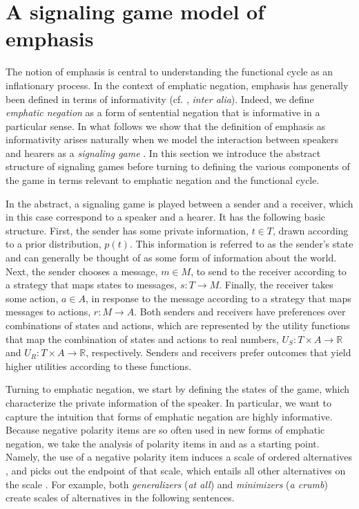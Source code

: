 \documentclass[linguex]{sp}
\theoremstyle{definition} \newtheorem{definition}{Definition}
\begin{document}
\section{A signaling game model of emphasis}
\label{Signaling}

The notion of emphasis is central to understanding the functional cycle as an inflationary process. In the context of emphatic negation, emphasis has generally been defined in terms of informativity (cf. \citealt{krifka1995polarity, detges-waltereit2002, kiparsky-condoravdi:2006}, \emph{inter alia}).  Indeed, we define \emph{emphatic negation} as a form of sentential negation that is informative in a particular sense. In what follows we show that the definition of emphasis as informativity arises naturally when we model the interaction between speakers and hearers as a \emph{signaling game} \citep{lewis:1969}. In this section we introduce the abstract structure of signaling games before turning to defining the various components of the game in terms relevant to emphatic negation and the functional cycle. 

In the abstract, a signaling game is played between a sender and a receiver, which in this case correspond to a speaker and a hearer. It has the following basic structure. First, the sender has some private information, $t \in T$, drawn according to a prior distribution, $p(t)$. This information is referred to as the sender's state and can generally be thought of as some form of information about the world. Next, the sender chooses a message, $m \in M$, to send to the receiver according to a strategy that maps states to messages, $s : T \rightarrow M$. Finally, the receiver takes some action, $a \in A$, in response to the message according to a strategy that maps messages to actions, $r : M \rightarrow A$. Both senders and receivers have preferences over combinations of states and actions, which are represented by the utility functions that map the combination of states and actions to real numbers, $U_S : T \times A \rightarrow \mathbb{R}$ and  $U_R : T \times A \rightarrow \mathbb{R}$, respectively. Senders and receivers prefer outcomes that yield higher utilities according to these functions.

Turning to emphatic negation, we start by defining the states of the game, which characterize the private information of the speaker. In particular, we want to capture the intuition that forms of emphatic negation are highly informative. Because negative polarity items are so often used in new forms of emphatic negation, we take the analysis of polarity items in \cite{krifka1995polarity} and  \cite{eckardt2006} as a starting point. Namely, the use of a negative polarity item induces  a scale of ordered alternatives \citep{rooth1992}, and picks out the endpoint of that scale, which entails all other alternatives on the scale \citep{fauconnier1975, horn:1989}. For example, both \emph{generalizers} (\emph{at all}) and \emph{minimizers} (\emph{a crumb}) create scales of alternatives in the following sentences.
\end{document}
